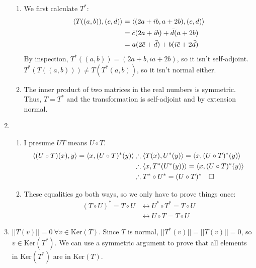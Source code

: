 \documentclass[12pt]{article}
\begin{document}
\begin{enumerate}
\begin{enumerate}
                  \item We first calculate $T^*$:
                        \begin{align*}
                              \braket{T((a, b)), (c, d)} & = \braket{(2a+ib, a+2b), (c, d)}           \\
                                                         & = \bar{c}(2a+ib)+\bar{d}(a+2b)             \\
                                                         & = a(2\bar{c}+\bar{d})+b(i\bar{c}+2\bar{d})
                        \end{align*}
                        By inspection, $T^*((a, b))=(2a+b, ia+2b)$, so it isn't self-adjoint.
                        $T^*(T((a, b))) \ne T(T^*(a, b))$, so it isn't normal either.

                        \setcounter{enumii}{4}
                  \item The inner product of two matrices in the real numbers is symmetric.
                        Thus, $T=T^*$ and the transformation is self-adjoint and by extension normal.
            \end{enumerate}
      \item \begin{enumerate}
                  \item \label{list:9a} I presume $UT$ means $U \circ T$.
                        \begin{align*}
                              \braket{(U\circ T)(x), y}=\braket{x, (U \circ T)^*(y)}
                               & \therefore \braket{T(x), U^*(y)}=\braket{x, (U \circ T)^*(y)}   \\
                               & \therefore \braket{x, T^*(U^*(y))}=\braket{x, (U \circ T)^*(y)} \\
                               & \therefore T^* \circ U^* = (U \circ T)^*\quad\square
                        \end{align*}
                  \item These equalities go both ways, so we only have to prove things once:
                        \begin{align*}
                              (T \circ U)^* = T \circ U
                               & \leftrightarrow U^* \circ T^* = T \circ U \\
                               & \leftrightarrow U \circ T = T \circ U
                        \end{align*}
            \end{enumerate}
      \item $||T(v)||=0\ \forall v \in \text{Ker}(T)$.
            Since $T$ is normal, $||T^*(v)||=||T(v)||=0$, so $v \in \text{Ker}(T^*)$.
            We can use a symmetric argument to prove that all elements in $\text{Ker}(T^*)$
            are in $\text{Ker}(T)$.


\end{enumerate}
\end{document}
